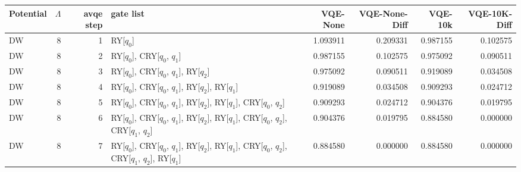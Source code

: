 \begin{tabular}{lrrlrrrr}
\toprule
Potential & $\Lambda$ & avqe step & gate list & VQE-None & VQE-None-Diff & VQE-10k & VQE-10K-Diff \\
\midrule
DW & 8 & 1 & RY[$q_0$] & 1.093911 & 0.209331 & 0.987155 & 0.102575 \\
DW & 8 & 2 & RY[$q_0$], CRY[$q_0$, $q_1$] & 0.987155 & 0.102575 & 0.975092 & 0.090511 \\
DW & 8 & 3 & RY[$q_0$], CRY[$q_0$, $q_1$], RY[$q_2$] & 0.975092 & 0.090511 & 0.919089 & 0.034508 \\
DW & 8 & 4 & RY[$q_0$], CRY[$q_0$, $q_1$], RY[$q_2$], RY[$q_1$] & 0.919089 & 0.034508 & 0.909293 & 0.024712 \\
DW & 8 & 5 & RY[$q_0$], CRY[$q_0$, $q_1$], RY[$q_2$], RY[$q_1$], CRY[$q_0$, $q_2$] & 0.909293 & 0.024712 & 0.904376 & 0.019795 \\
DW & 8 & 6 & RY[$q_0$], CRY[$q_0$, $q_1$], RY[$q_2$], RY[$q_1$], CRY[$q_0$, $q_2$], CRY[$q_1$, $q_2$] & 0.904376 & 0.019795 & 0.884580 & 0.000000 \\
DW & 8 & 7 & RY[$q_0$], CRY[$q_0$, $q_1$], RY[$q_2$], RY[$q_1$], CRY[$q_0$, $q_2$], CRY[$q_1$, $q_2$], RY[$q_1$] & 0.884580 & 0.000000 & 0.884580 & 0.000000 \\
\bottomrule
\end{tabular}
